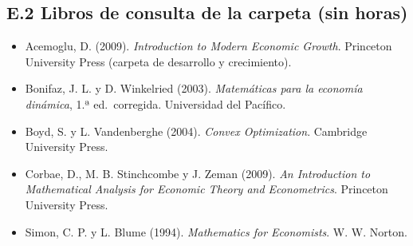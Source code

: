 \documentclass[11pt,a4paper]{article}
\begin{document}
\subsection*{E.2 Libros de consulta de la carpeta (sin horas)}
{\small
\begin{itemize}[leftmargin=1.4em,itemsep=1pt,label={}]
\item Acemoglu, D. (2009). \emph{Introduction to Modern Economic Growth}. Princeton University Press (carpeta de desarrollo y crecimiento).
\item Bonifaz, J. L. y D. Winkelried (2003). \emph{Matemáticas para la economía dinámica}, 1.ª ed.\ corregida. Universidad del Pacífico.
\item Boyd, S. y L. Vandenberghe (2004). \emph{Convex Optimization}. Cambridge University Press.
\item Corbae, D., M. B. Stinchcombe y J. Zeman (2009). \emph{An Introduction to Mathematical Analysis for Economic Theory and Econometrics}. Princeton University Press.
\item Simon, C. P. y L. Blume (1994). \emph{Mathematics for Economists}. W. W. Norton.
\end{itemize}
}
\end{document}

